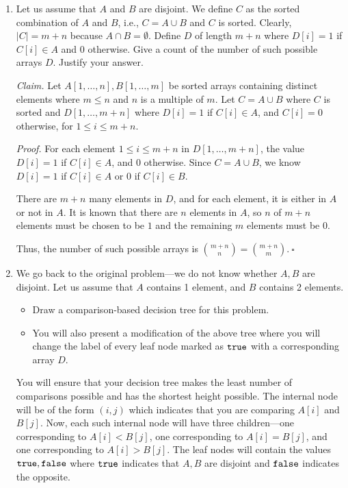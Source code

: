 \begin{enumerate}
	\item Let us assume that $A$ and $B$ are disjoint.
	We define $C$ as the sorted combination of
	$A$ and $B$, i.e., $C=A\cup B$ and $C$ is sorted. Clearly,
	$|C|=m+n$ because $A\cap B=\emptyset$. Define
	$D$ of length $m+n$ where $D[i]=1$ if $C[i]\in A$ and 0
	otherwise. Give a count of the number of such possible
	arrays $D$. Justify your answer. 

\begin{solution}\textit{Claim. }Let $A[1,\dots,n],B[1,\dots,m]$ be sorted arrays containing distinct elements where $m\leq n$ and $n$ is a multiple of $m$. Let $C=A\cup B$ where $C$ is sorted and $D[1,\dots,m+n]$ where $D[i]=1$ if $C[i]\in A$, and $C[i]=0$ otherwise, for $1\leq i\leq m+n$.

\textit{Proof. }For each element $1\leq i\leq m+n$ in $D[1,\dots,m+n]$, the value $D[i]=1$ if $C[i]\in A$, and $0$ otherwise. Since $C=A\cup B$, we know $D[i]=1$ if $C[i]\in A$ or $0$ if $C[i]\in B$.

There are $m+n$ many elements in $D$, and for each element, it is either in $A$ or not in $A$. It is known that there are $n$ elements in $A$, so $n$ of $m+n$ elements must be chosen to be $1$ and the remaining $m$ elements must be $0$.

Thus, the number of such possible arrays is $\binom{m+n}{n}=\binom{m+n}{m}$.$~\square$

\end{solution}

	\item We go back to the original problem---we do not know whether $A,B$ are disjoint. Let us assume that $A$ contains 1 element, and $B$ contains 2 elements. 
	
	\begin{itemize}
	\item Draw a comparison-based decision tree for this problem.
	\item You will also present a modification of the above tree
	where you will change the label of every leaf node marked as $\mathtt{true}$ 
	with a corresponding array $D$. 
	\end{itemize}
	
	You will ensure that your decision tree makes 
	the least number of comparisons possible and has
	the shortest height possible. The internal 
	node will be of the form $(i,j)$ which 
	indicates that you are comparing $A[i]$ and $B[j]$. 
	Now, each such internal node will have three children---one corresponding to $A[i]<B[j]$, one corresponding to $A[i]=B[j]$,
	and one corresponding to $A[i]>B[j]$. The leaf
	nodes will contain the values $\mathtt{true},\mathtt{false}$
	where $\mathtt{true}$ indicates that $A,B$ are disjoint
	and $\mathtt{false}$ indicates the opposite. 
	

\end{enumerate}
